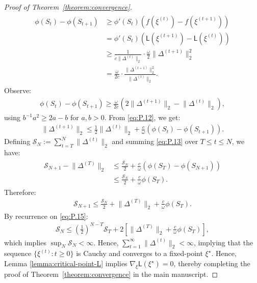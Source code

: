 \documentclass[12pt]{article}
\numberwithin{equation}{section}
\begin{document}
\begin{proof}[Proof of Theorem~\ref{theorem:convergence}]
\begin{align}
    \begin{split}
        \phi(S_t) - \phi(S_{t+1}) &\geq \phi'(S_t)(f(\xi^{(t)}) - f(\xi^{(t+1)}))\\
        &= \phi'(S_t)(\mathsf{L}(\xi^{(t+1)}) - \mathsf{L}(\xi^{(t)}))\\
        &\geq \frac{1}{c\lVert \Delta^{(t)}\rVert_2}\cdot \frac{\omega}{2}\lVert \Delta^{(t+1)}\rVert^2_2\\
        &= \frac{\omega}{2c}\cdot \frac{\lVert \Delta^{(t+1)}\rVert^{2}_2}{\lVert \Delta^{(t)}\rVert_2}.
    \end{split}
\end{align}
Observe:
\begin{align}\label{eq:P.12}
 \phi(S_t) - \phi(S_{t+1}) \geq \frac{\omega}{2c}\left(2\lVert \Delta^{(t+1)}\rVert_2 - \lVert \Delta^{(t)}\rVert_2\right),   
\end{align}
using $b^{-1}a^2 \geq 2a-b$ for $a, b>0$. From \eqref{eq:P.12}, we get:
\begin{align}\label{eq:P.13}
    \lVert \Delta^{(t+1)}\rVert_2 \leq \frac{1}{2}\lVert \Delta^{(t)}\rVert_2+ \frac{c}{\omega}(\phi(S_t) - \phi(S_{t+1})).
\end{align}
Defining $\mathcal{S}_N:= \sum_{t=T}^{N}\lVert \Delta^{(t)}\rVert_2$ and summing \eqref{eq:P.13} over $T\leq t\leq N$, we have:
\begin{align}\label{eq:P.14}
\begin{split}
    \mathcal{S}_{N+1} - \lVert \Delta^{(T)}\rVert_2 &\leq \frac{\mathcal{S}_N}{2} + \frac{c}{\omega}(\phi(S_T) - \phi(S_{N+1}))\\
    &\leq \frac{\mathcal{S}_N}{2} + \frac{c}{\omega}\phi(S_T).
\end{split}
\end{align}
Therefore:
\begin{align}\label{eq:P.15}
    \mathcal{S}_{N+1} \leq \frac{\mathcal{S}_N}{2} + \lVert \Delta^{(T)}\rVert_2 + \frac{c}{\omega}\phi(S_T).
\end{align}
By recurrence on \eqref{eq:P.15}:
\begin{align}\label{eq:P.16}
    \mathcal{S}_N \leq \left(\frac{1}{2}\right)^{N-T}\mathcal{S}_T + 2\left[\lVert \Delta^{(T)}\rVert_2 +\frac{c}{\omega}\phi(S_T)\right],
\end{align}
which implies $\sup_N \mathcal{S}_N <\infty$. Hence, $\sum_{t=1}^{\infty}\lVert \Delta^{(t)}\rVert_2 <\infty$, implying that the sequence $\{\xi^{(t)}: t\geq 0\}$ is Cauchy and converges to a fixed-point $\xi^{\star}$. Hence, Lemma \ref{lemma:critical-point-L} implies $\nabla_{\xi}\mathsf{L}(\xi^{\star}) = 0$, thereby completing the proof of Theorem~\ref{theorem:convergence} in the main manuscript.

\end{proof}
\end{document}
